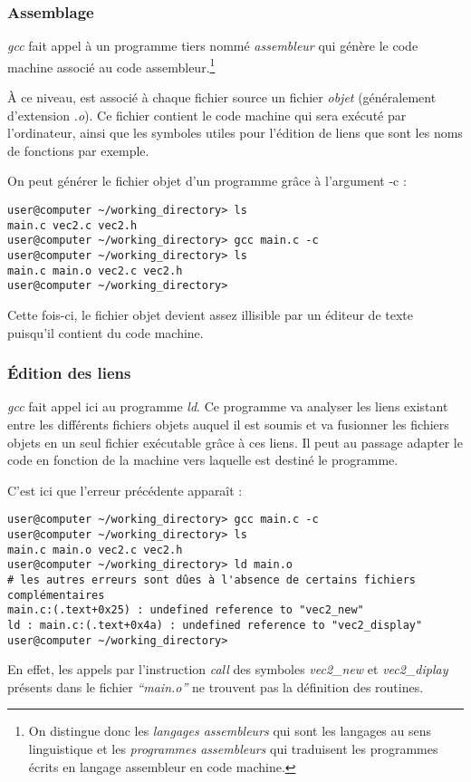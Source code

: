 \documentclass[../../../main.tex]{subfiles}
\begin{document}
\subsubsection{Assemblage}
\textit{gcc} fait appel à un programme tiers nommé \textit{assembleur} qui génère le code machine associé au code assembleur.\footnote{On distingue donc les \textit{langages assembleurs} qui sont les langages au sens linguistique et les \textit{programmes assembleurs} qui traduisent les programmes écrits en langage assembleur en code machine.}
 
À ce niveau, est associé à chaque fichier source un fichier \textit{objet} (généralement d'extension \textit{.o}). Ce fichier contient le code machine qui sera exécuté par l'ordinateur, ainsi que les symboles utiles pour l'édition de liens que sont les noms de fonctions par exemple.
 
On peut générer le fichier objet d'un programme grâce à l'argument \textsf{-c} :
\begin{verbatim}
user@computer ~/working_directory> ls
main.c vec2.c vec2.h
user@computer ~/working_directory> gcc main.c -c
user@computer ~/working_directory> ls
main.c main.o vec2.c vec2.h
user@computer ~/working_directory>
\end{verbatim}
Cette fois-ci, le fichier objet devient assez illisible par un éditeur de texte puisqu'il contient du code machine.
\subsubsection{Édition des liens}
\textit{gcc} fait appel ici au programme \textit{ld}. Ce programme va analyser les liens existant entre les différents fichiers objets auquel il est soumis et va fusionner les fichiers objets en un seul fichier exécutable grâce à ces liens. Il peut au passage adapter le code en fonction de la machine vers laquelle est destiné le programme.
 
C'est ici que l'erreur précédente apparaît :
\begin{verbatim}
user@computer ~/working_directory> gcc main.c -c
user@computer ~/working_directory> ls
main.c main.o vec2.c vec2.h
user@computer ~/working_directory> ld main.o
# les autres erreurs sont dûes à l'absence de certains fichiers complémentaires
main.c:(.text+0x25) : undefined reference to "vec2_new"
ld : main.c:(.text+0x4a) : undefined reference to "vec2_display"
user@computer ~/working_directory> 
\end{verbatim}
En effet, les appels par l'instruction \textit{call} des symboles \textit{vec2\_new} et \textit{vec2\_diplay} présents dans le fichier \textit{``main.o''} ne trouvent pas la définition des routines.
\end{document}
